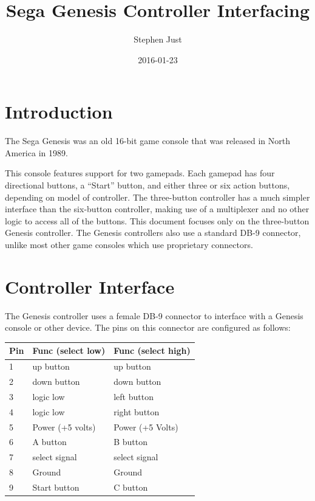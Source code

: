 \documentclass{capstonedoc}
\title{Sega Genesis Controller Interfacing}
\date{2016-01-23}
\author{Stephen Just}
\begin{document}
\maketitle


\section{Introduction}
The Sega Genesis was an old 16-bit game console that was released in North
America in 1989. \cite{SGHistory}

This console features support for two gamepads. Each gamepad has four
directional buttons, a ``Start'' button, and either three or six action
buttons, depending on model of controller. The three-button controller has a
much simpler interface than the six-button controller, making use of a
multiplexer and no other logic to access all of the buttons. This document
focuses only on the three-button Genesis controller. The Genesis controllers
also use a standard DB-9 connector, unlike most other game consoles which
use proprietary connectors.\cite{SGCHwInfo}

\section{Controller Interface}
The Genesis controller uses a female DB-9 connector to interface with a Genesis
console or other device. The pins on this connector are configured as follows:

\vspace{5mm}
\begin{tabular}{ l | l | l }
  Pin & Func (select low) & Func (select high) \\ \hline \hline
  1   & up button         & up button          \\
  2   & down button       & down button        \\
  3   & logic low         & left button        \\
  4   & logic low         & right button       \\
  5   & Power (+5 volts)  & Power (+5 Volts)   \\
  6   & A button          & B button           \\
  7   & select signal     & select signal      \\
  8   & Ground            & Ground             \\
  9   & Start button      & C button           \\
\end{tabular}
\vspace{5mm}
\end{document}

